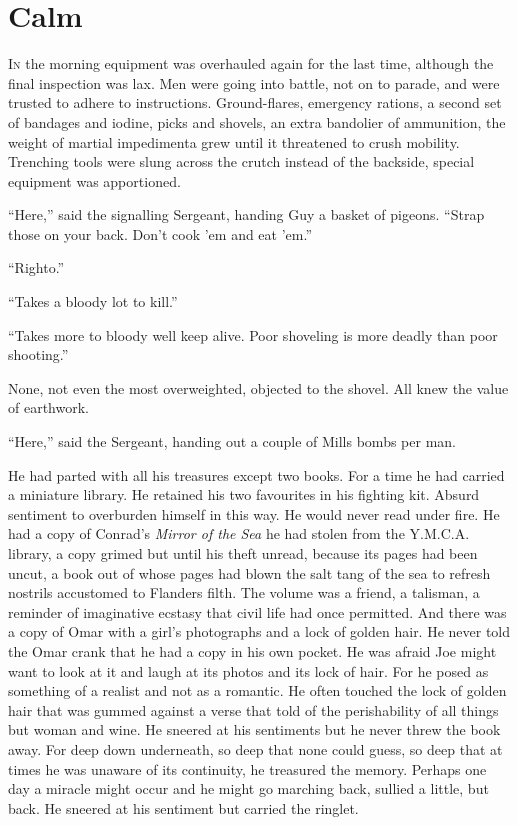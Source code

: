 \chapter*{\textsf{Calm}}

I\textsc{n} the morning equipment was overhauled again for the last time, although the final inspection was lax. Men were going into battle, not on to parade, and were trusted to adhere to instructions. Ground-flares, emergency rations, a second set of bandages and iodine, picks and shovels, an extra bandolier of ammunition, the weight of martial impedimenta grew until it threatened to crush mobility. Trenching tools were slung across the crutch instead of the backside, special equipment was apportioned.

``Here,'' said the signalling Sergeant, handing Guy a basket of pigeons. ``Strap those on your back. Don't cook 'em and eat 'em.''

``Righto.''

``Takes a bloody lot to kill.''

``Takes more to bloody well keep alive. Poor shoveling is more deadly than poor shooting.''

None, not even the most overweighted, objected to the shovel. All knew the value of earthwork.

``Here,'' said the Sergeant, handing out a couple of Mills bombs per man.

He had parted with all his treasures except two books. For a time he had carried a miniature library. He retained his two favourites in his fighting kit. Absurd sentiment to overburden himself in this way. He would never read under fire. He had a copy of Conrad's \textit{Mirror of the Sea} he had stolen from the Y.M.C.A. library, a copy grimed but until his theft unread, because its pages had been uncut, a book out of whose pages had blown the salt tang of the sea to refresh nostrils accustomed to Flanders filth. The volume was a friend, a talisman, a reminder of imaginative ecstasy that civil life had once permitted. And there was a copy of Omar with a girl's photographs and a lock of golden hair. He never told the Omar crank that he had a copy in his own pocket. He was afraid Joe might want to look at it and laugh at its photos and its lock of hair. For he posed as something of a realist and not as a romantic. He often touched the lock of golden hair that was gummed against a verse that told of the perishability of all things but woman and wine. He sneered at his sentiments but he never threw the book away. For deep down underneath, so deep that none could guess, so deep that at times he was unaware of its continuity, he treasured the memory. Perhaps one day a miracle might occur and he might go marching back, sullied a little, but back. He sneered at his sentiment but carried the ringlet.

